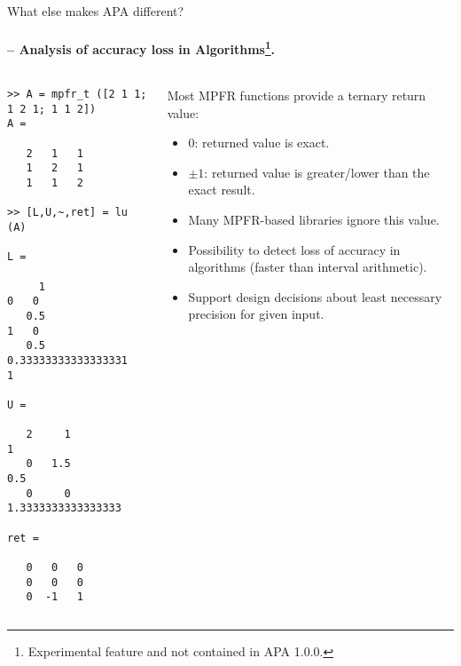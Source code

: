 \begin{frame}[fragile]{What else makes APA different?}
\framesubtitle{-- Analysis of accuracy loss in Algorithms\footnote{Experimental
feature and not contained in APA 1.0.0.}.}

\begin{columns}
\begin{column}{0.35\linewidth}
\begin{lstlisting}[basicstyle=\tiny]
>> A = mpfr_t ([2 1 1; 1 2 1; 1 1 2])
A =

   2   1   1
   1   2   1
   1   1   2

>> [L,U,~,ret] = lu (A)

L =

     1                     0   0
   0.5                     1   0
   0.5   0.33333333333333331   1

U =

   2     1                    1
   0   1.5                  0.5
   0     0   1.3333333333333333

ret =

   0   0   0
   0   0   0
   0  -1   1
\end{lstlisting}
\end{column}
\begin{column}{0.55\linewidth}
Most MPFR functions provide a ternary return value:
\begin{itemize}
\item $0$: returned value is exact.
\item $\pm 1$: returned value is greater/lower than the exact result.

\bigskip

\item
Many MPFR-based libraries ignore this value.

\item
Possibility to detect loss of accuracy in algorithms
(faster than interval arithmetic).

\item
Support design decisions about least necessary precision
for given input.
\end{itemize}
\end{column}
\end{columns}
\end{frame}